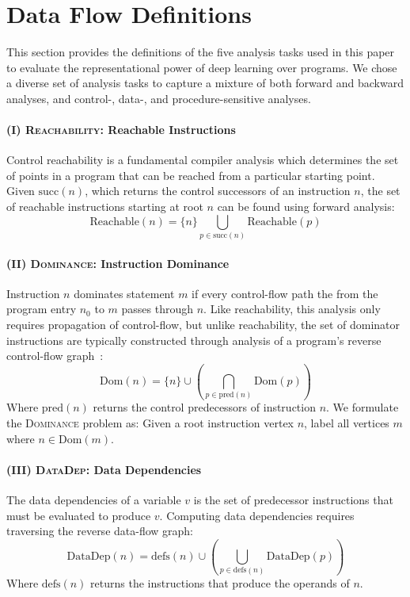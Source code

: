 \section{Data Flow Definitions}
\label{appendix:dataflow_problems}

This section provides the definitions of the five analysis tasks used in this
paper to evaluate the representational power of deep learning over programs. We
chose a diverse set of analysis tasks to capture a mixture of both forward and
backward analyses, and control-, data-, and procedure-sensitive analyses.

\paragraph{(I) \textsc{Reachability}: Reachable Instructions} Control
reachability is a fundamental compiler analysis which determines the set of
points in a program that can be reached from a particular starting point. Given
$\text{succ}(n)$, which returns the control successors of an instruction $n$,
the set of reachable instructions starting at root $n$ can be found using
forward analysis:
\begin{equation*}
  \text{Reachable}(n) = \{n\} \bigcup_{p \in \text{succ}(n)} \text{Reachable}(p)
\end{equation*}

\paragraph{(II) \textsc{Dominance}: Instruction Dominance} Instruction $n$
dominates statement $m$ if every control-flow path the from the program entry
$n_0$  to $m$ passes through $n$. Like reachability, this analysis only requires
propagation of control-flow, but unlike reachability, the set of dominator
instructions are typically constructed through analysis of a program's reverse
control-flow graph~\citep{Lengauer1979,Blazy2015}:
\begin{equation*}
  \text{Dom}(n) = \{n\} \cup \left( \bigcap_{p \in \text{pred}(n)} \text{Dom}(p) \right)
\end{equation*}
Where $\text{pred}(n)$ returns the control predecessors of instruction $n$. We
formulate the \textsc{Dominance} problem as: Given a root instruction vertex
$n$, label all vertices $m$ where $n \in \text{Dom}(m)$.

\paragraph{(III) \textsc{DataDep}: Data Dependencies} The data dependencies of a
variable $v$ is the set of predecessor instructions that must be evaluated to
produce $v$. Computing data dependencies requires traversing the reverse
data-flow graph:
\begin{equation*}
  \text{DataDep}(n) = \text{defs}(n) \cup \left( \bigcup_{p \in \text{defs}(n)} \text{DataDep}(p) \right)
\end{equation*}
Where $\text{defs}(n)$ returns the instructions that produce the operands of
$n$.

